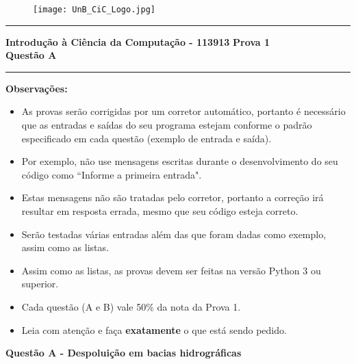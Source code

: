 \documentclass[a4paper, 12pt]{article}
\begin{document}
\begin{figure}[H]
	\texttt{[image: UnB\_CiC\_Logo.jpg]}
\end{figure}
\noindent\rule{\textwidth}{0.4pt}
\begin{center}
	\textbf{{\Large Introdução à Ciência da Computação - 113913}} \newline \newline
	\textbf{{\large Prova 1} \\
	\vspace{9pt}
	{\large Questão A}} \\
	\noindent\rule{\textwidth}{0.4pt}
	\newline
\end{center}

\textbf{{\large Observações:}}
\begin{itemize}
	\item As provas serão corrigidas por um corretor automático, portanto é necessário que as entradas e saídas do seu programa estejam conforme o padrão especificado em cada questão (exemplo de entrada e saída).
	\item Por exemplo, não use mensagens escritas durante o desenvolvimento do seu código como “Informe a primeira entrada".
	\item Estas mensagens não são tratadas pelo corretor, portanto a correção irá resultar em resposta errada, mesmo que seu código esteja correto.
	\item Serão testadas várias entradas além das que foram dadas como exemplo, assim como as listas.
	\item Assim como as listas, as provas devem ser feitas na versão Python 3 ou superior.
	\item Cada questão (A e B) vale 50\% da nota da Prova 1.
	\item Leia com atenção e faça \textbf{exatamente} o que está sendo pedido.


\end{itemize}
\newpage %
\begin{center}
\textbf{{\Large Questão A - Despoluição em bacias hidrográficas}}
\end{center}

\vspace{5pt} 
\end{document}
